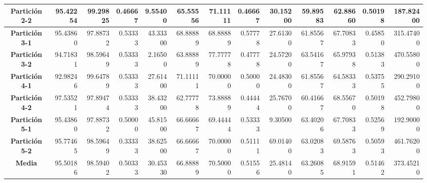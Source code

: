 \documentclass[a4paper,11pt]{article}
\begin{document}
\begin{table}[H]
\begin{adjustbox}{width=1.1\textwidth}
\begin{tabular}{|c|r|r|r|r|r|r|r|r|r|r|r|r|}
    \textbf{Partición 2-2} & 95.42254 & 99.29825 & 0.46667 & 9.55400 & 65.55556 & 71.11111 & 0.46667 & 30.15200 & 59.89583 & 62.88660 & 0.50198 & 187.82400 \\ \hline
    \textbf{Partición 3-1} & 95.43860 & 97.88732 & 0.53333 & 43.33300 & 68.88889 & 68.88889 & 0.57778 & 27.61300 & 61.85567 & 67.70833 & 0.45850 & 315.47400 \\ \hline
    \textbf{Partición 3-2} & 94.71831 & 98.59649 & 0.53333 & 2.16500 & 63.88889 & 77.77778 & 0.47778 & 24.57200 & 63.54167 & 65.97938 & 0.51383 & 470.55800 \\ \hline
    \textbf{Partición 4-1} & 92.98246 & 99.64789 & 0.53333 & 27.61400 & 71.11111 & 70.00000 & 0.50000 & 24.48300 & 61.85567 & 64.58333 & 0.53755 & 290.29100 \\ \hline
    \textbf{Partición 4-2} & 97.53521 & 97.89474 & 0.53333 & 38.43200 & 62.77778 & 73.88889 & 0.44444 & 25.76700 & 60.41667 & 68.55670 & 0.50198 & 452.79800 \\ \hline
    \textbf{Partición 5-1} & 95.43860 & 97.88732 & 0.50000 & 45.81500 & 66.66667 & 69.44444 & 0.53333 & 9.30500 & 63.40206 & 67.70833 & 0.52569 & 192.90000 \\ \hline
    \textbf{Partición 5-2} & 95.77465 & 98.59649 & 0.33333 & 38.62500 & 66.66667 & 70.00000 & 0.51111 & 69.01400 & 63.02083 & 69.58763 & 0.50593 & 461.76200 \\ \hline
    \textbf{Media} & 95.50186 & 98.59402 & 0.50333 & 30.45330 & 66.88889 & 70.50000 & 0.51556 & 25.48140 & 63.26085 & 68.91591 & 0.51462 & 373.45210 \\ \hline
    \end{tabular}
    \end{adjustbox}
    \label{ES}
  \end{table}  
\end{document}
